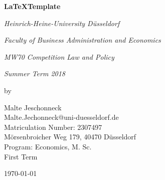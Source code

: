 \documentclass[a4paper]{scrartcl}
\begin{document}
	
	\def\sectionautorefname{section}
	\def\subsectionautorefname{section}
	\def\subsubsectionautorefname{section}
	\def\equationautorefname{equation}
	\def\algorithmautorefname{Algorithm}
	

	
	
	\thispagestyle{empty}
	
	\begin{titlepage}
		\centering
		\vspace{1cm}
		{\Large\bfseries \LaTeX Template \par}
		\vspace{4cm}
		{\large\itshape Heinrich-Heine-University Düsseldorf\par}
		\vspace{0.5cm}
		{\large\itshape Faculty of Business Administration and Economics\par}
		\vspace{0.5cm}
		{\large\itshape MW70 Competition Law and Policy\par}
		\vspace{0.5cm}
		{\large\itshape Summer Term 2018\par}
		{\large\itshape \par}
		\vfill
		by\par
		\vspace{0.5cm}
		Malte Jeschonneck\\
		Malte.Jechonneck@uni-duesseldorf.de\\
		Matriculation Number: 2307497\\
		Mörsenbroicher Weg 179, 40470 Düsseldorf\\
		Program: Economics, M. Sc.\\
		First Term
		
		
		\vfill
		
		{\large \today\par}
	\end{titlepage}

\restoregeometry %

\newpage
	\begin{abstract}
		 The increased prevalence of pricing algorithms incited an ongoing debate about new forms of collusion. The concern is that intelligent algorithms may be able to forge collusive schemes without being explicitly instructed to do so. I attempt to examine the ability of competing \emph{reinforcement learning} algorithms to maintain collusive prices in a simulated oligopoly of price competition. To my knowledge, this study is the first to use a reinforcement learning system with linear function approximation and eligibility traces in an economic environment. I show that the deployed agents sustain supra-competitive prices, but tend to be exploitable in the short-term. The degree of collusion crucially hinges on the utilized method to estimate the qualities of actions. This finding is robust to variations of parameters that control the learning process.
	\end{abstract}
	
\end{document}
